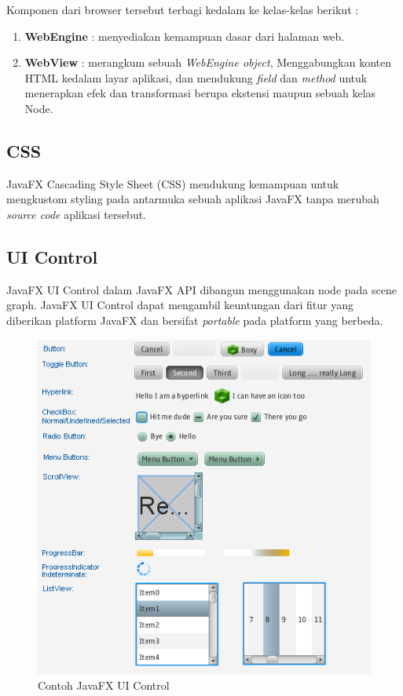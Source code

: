 Komponen dari browser tersebut terbagi kedalam ke kelas-kelas berikut :\cite{javafx}
\begin{enumerate}
	\item \textbf{WebEngine} : menyediakan kemampuan dasar dari halaman web.
	\item \textbf{WebView} : merangkum sebuah \textit{WebEngine object}, Menggabungkan konten HTML kedalam layar aplikasi, dan mendukung \textit{field} dan \textit{method} untuk menerapkan efek dan transformasi berupa ekstensi maupun sebuah kelas Node.
\end{enumerate}

\subsection{CSS}
\label{subs:CSS}
JavaFX Cascading Style Sheet (CSS) mendukung kemampuan untuk mengkustom styling pada antarmuka sebuah aplikasi JavaFX tanpa merubah \textit{source code} aplikasi tersebut.\cite{javafx}   

\subsection{UI Control}
\label{subs:UI_Control}
JavaFX UI Control dalam JavaFX API dibangun menggunakan node pada scene graph. JavaFX UI Control dapat mengambil keuntungan dari fitur yang diberikan platform JavaFX dan bersifat \textit{portable} pada platform yang berbeda.\cite{javafx}

\begin{figure}[H]
	\centering
	\includegraphics[scale=0.8]{Gambar/JavaFXuicontrols}
	\caption{Contoh JavaFX UI Control}
	\end{figure}
	
